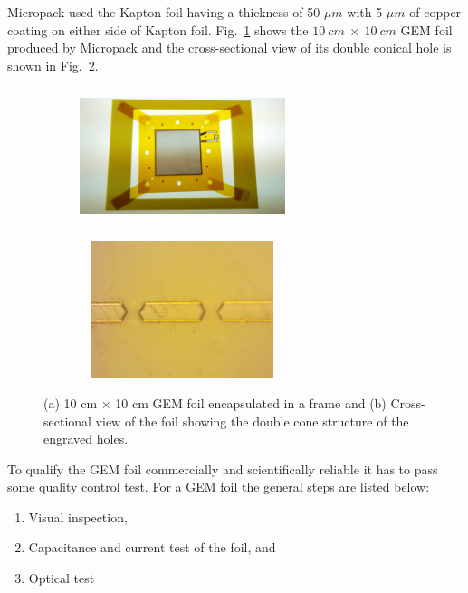 Micropack used the Kapton foil having a thickness of 50 $\mu m$ with 5 $\mu m$ of copper coating on either side of Kapton foil. Fig.~\ref{fig:Foil_and_Cone_a} shows the $10~cm~\times~10~cm$ GEM foil produced by Micropack and the cross-sectional view of its double conical hole is shown in Fig.~\ref{fig:Foil_and_Cone_b}.
\begin{figure}[!htbp]
    \centering
    \begin{subfigure}[b]{0.46\textwidth}
        \includegraphics[width=6cm, height=4cm]{figures/GEM/figures/Foil_01.png}\qquad
        \caption{ }
        \label{fig:Foil_and_Cone_a}
    \end{subfigure}
    \begin{subfigure}[b]{0.46\textwidth}
        \includegraphics[width=6cm, height=4cm]{figures/GEM/figures/double_cone.png}
        \caption{ }
        \label{fig:Foil_and_Cone_b}
    \end{subfigure}
   \caption{(a) 10 cm $\times$ 10 cm GEM foil encapsulated in a frame and (b) Cross-sectional view of the foil showing the double cone structure of the engraved holes. } \label{fig:Foil_and_Cone}
\end{figure}

To qualify the GEM foil commercially and scientifically reliable it has to pass some quality control test. For a GEM foil the general steps are listed below:
\begin{enumerate}
    \item Visual inspection,
    \item Capacitance and current test of the foil, and
    \item Optical test
\end{enumerate}

